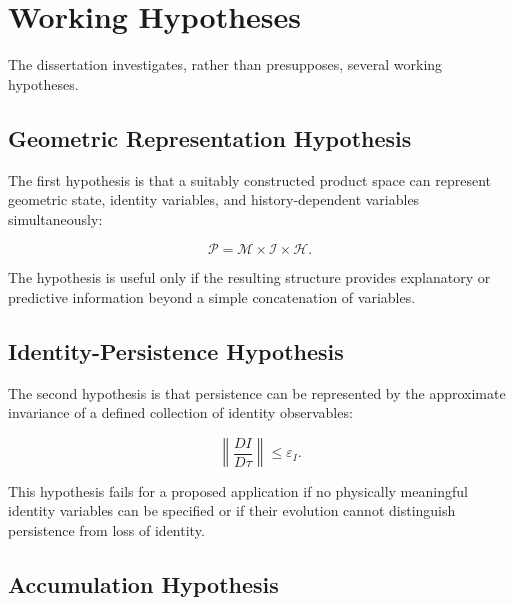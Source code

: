\documentclass[12pt,oneside]{book}
\begin{document}

\section{Working Hypotheses}
\label{sec:working-hypotheses}

The dissertation investigates, rather than presupposes, several
working hypotheses.

\subsection{Geometric Representation Hypothesis}

The first hypothesis is that a suitably constructed product
space can represent geometric state, identity variables, and
history-dependent variables simultaneously:

\begin{equation}
    \mathcal{P}
    =
    \mathcal{M}
    \times
    \mathcal{I}
    \times
    \mathcal{H}.
\end{equation}

The hypothesis is useful only if the resulting structure
provides explanatory or predictive information beyond a simple
concatenation of variables.

\subsection{Identity-Persistence Hypothesis}

The second hypothesis is that persistence can be represented by
the approximate invariance of a defined collection of identity
observables:

\begin{equation}
    \left\|
        \frac{DI}{D\tau}
    \right\|
    \leq
    \varepsilon_I.
    \label{eq:identity-hypothesis}
\end{equation}

This hypothesis fails for a proposed application if no
physically meaningful identity variables can be specified or if
their evolution cannot distinguish persistence from loss of
identity.

\subsection{Accumulation Hypothesis}
\end{document}
